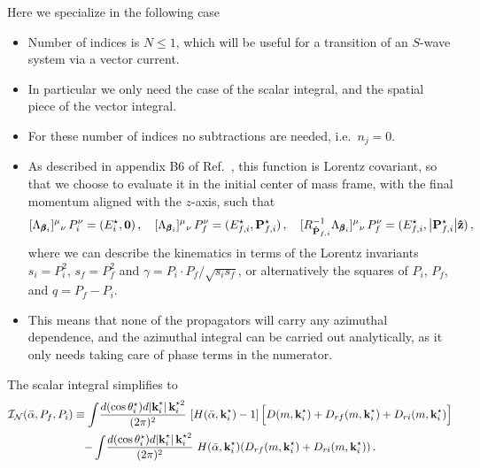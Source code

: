\documentclass[aps,prd,onecolumn,groupedaddress]{revtex4-2}
\begin{document}
Here we specialize in the following case
\begin{itemize}
    \item Number of indices is $N\leq 1$, which will be useful for a transition of an $S$-wave system via a vector current.
    \item In particular we only need the case of the scalar integral, and the spatial piece of the vector integral.
    \item For these number of indices no subtractions are needed, i.e.\ $n_j=0$.
    \item As described in appendix B6 of Ref.~\cite{Baroni:2018iau}, this function is Lorentz covariant, so that we choose to evaluate it in the initial center of mass frame, with the final momentum aligned with the $z$-axis, such that
    \begin{equation}
    \label{eq:CMinitial}
        [\Lambda_{\pmb \beta_i}]^\mu{}_\nu \,P^\nu_i=(E_i^\star, \vb 0)\,,\quad [\Lambda_{\pmb \beta_i}]^\mu{}_\nu \, P_f^\nu=(E_{f,i}^\star, \mathbf P_{f,i}^\star)\,,\quad [R^{-1}_{\vu P_{f,i}}\Lambda_{\pmb \beta_i}]^\mu{}_\nu \, P_f^\nu=(E_{f,i}^\star, \abs{\mathbf P_{f,i}^\star}\vu z)\,,
    \end{equation}
    where we can describe the kinematics in terms of the Lorentz invariants $s_i=P_i^2$, $s_f=P_f^2$ and $\gamma = P_i\cdot P_f/\sqrt{s_is_f}$, or alternatively the squares of $P_i$, $P_f$, and $q=P_f-P_i$.
    \item This means that none of the propagators will carry any azimuthal dependence, and the azimuthal integral can be carried out analytically, as it only needs taking care of phase terms in the numerator.
\end{itemize}

The scalar integral simplifies to
\begin{multline}
\mathcal I_{\mathcal N}(\bar{\alpha}, P_f, P_i) \equiv  \int \! \frac{d(\cos \theta^\star_i) d\abs{\textbf k^\star_i}\, \textbf k^{\star2}_i}{(2\pi)^2} \, 
\,
 [H(\bar{\alpha}, \textbf k^\star_i) - 1]
 \,
\Big [ D(m, \textbf k^\star_i) + D_{rf}(m, \textbf k^\star_i) + D_{ri}(m, \textbf k^\star_i) \Big ]  
 \\
%
 -  \int \! \frac{d(\cos \theta^\star_i) d\abs{\textbf k^\star_i}\, \textbf k^{\star2}_i}{(2\pi)^2} \, 
 \, H(\bar{\alpha}, \textbf k^\star_i)   \qty( D_{rf}(m, \textbf k^\star_i) + D_{ri}(m, \textbf k^\star_i) ) \,.
\end{multline}
\end{document}
